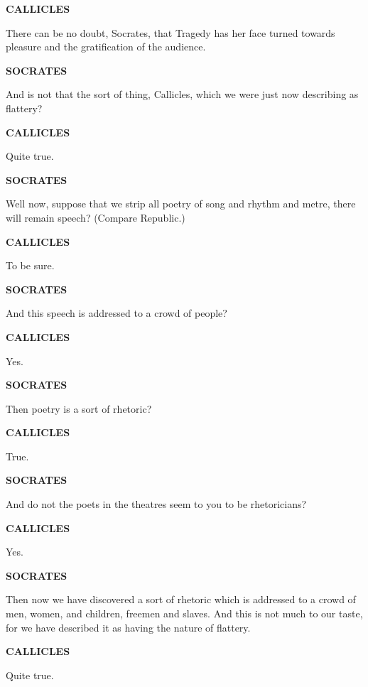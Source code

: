 \documentclass[11pt,letter]{article}
\begin{document}
\par \textbf{CALLICLES}
\par   There can be no doubt, Socrates, that Tragedy has her face turned towards pleasure and the gratification of the audience.

\par \textbf{SOCRATES}
\par   And is not that the sort of thing, Callicles, which we were just now describing as flattery?

\par \textbf{CALLICLES}
\par   Quite true.

\par \textbf{SOCRATES}
\par   Well now, suppose that we strip all poetry of song and rhythm and metre, there will remain speech? (Compare Republic.)

\par \textbf{CALLICLES}
\par   To be sure.

\par \textbf{SOCRATES}
\par   And this speech is addressed to a crowd of people?

\par \textbf{CALLICLES}
\par   Yes.

\par \textbf{SOCRATES}
\par   Then poetry is a sort of rhetoric?

\par \textbf{CALLICLES}
\par   True.

\par \textbf{SOCRATES}
\par   And do not the poets in the theatres seem to you to be rhetoricians?

\par \textbf{CALLICLES}
\par   Yes.

\par \textbf{SOCRATES}
\par   Then now we have discovered a sort of rhetoric which is addressed to a crowd of men, women, and children, freemen and slaves. And this is not much to our taste, for we have described it as having the nature of flattery.

\par \textbf{CALLICLES}
\par   Quite true.
\end{document}
